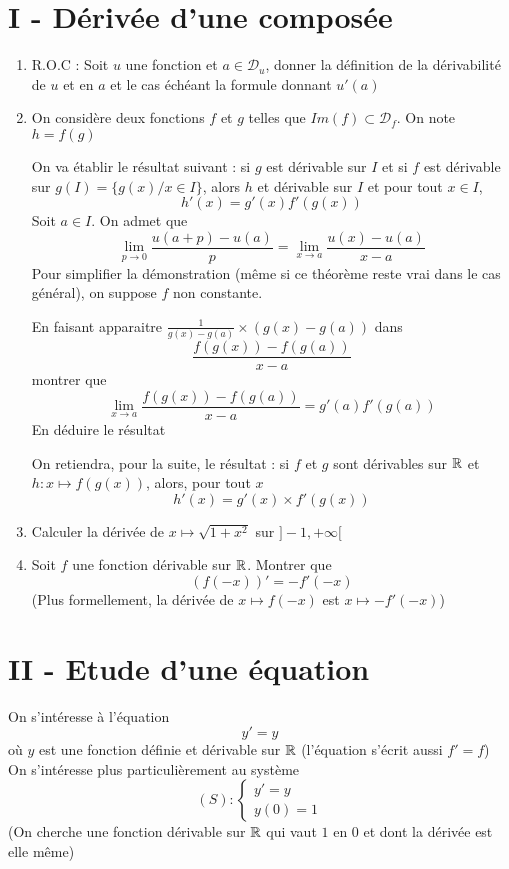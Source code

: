 \section*{I - Dérivée d'une composée}
\begin{enumerate}
\item R.O.C : Soit $u$ une fonction et $a\in \mathscr{D}_u$, donner la définition de la dérivabilité de $u$ et en $a$ et le cas échéant la formule donnant $u'(a)$
\item On considère deux fonctions $f$ et $g$ telles que $Im(f) \subset \mathscr{D}_f$. On note $h = f(g)$\newline

On va établir le résultat suivant : si $g$ est dérivable sur $I$ et si $f$ est dérivable sur $g(I) = \{g(x) / x\in I\}$, alors $h$ et dérivable sur $I$ et pour tout $x\in I$, $$h'(x) = g'(x)f'(g(x))$$
Soit $a \in I$. On admet que $$\underset{p\rightarrow 0}{\lim}\frac{u(a+p) - u(a)}{p} = \underset{x\rightarrow a}{\lim}\frac{u(x) - u(a)}{x-a}$$Pour simplifier la démonstration (même si ce théorème reste vrai dans le cas général), on suppose $f$ non constante.\newline 

En faisant apparaitre $\frac{1}{g(x) - g(a)} \times (g(x) - g(a))$ dans $$\frac{f(g(x)) - f(g(a))}{x- a}$$ montrer que $$ \underset{x\rightarrow a}{\lim}\frac{f(g(x)) - f(g(a))}{x -a} = g'(a)f'(g(a))$$ En déduire le résultat\newline

On retiendra, pour la suite, le résultat : si $f$ et $g$ sont dérivables sur $\mathbb{R}$ et $h:x\mapsto f(g(x))$, alors, pour tout $x$
$$\boxed{h'(x) = g'(x)\times f'(g(x))}$$
\item Calculer la dérivée de $x\mapsto \sqrt{1+x^2}$ sur $]-1,+\infty[$
\item Soit $f$ une fonction dérivable sur $\mathbb{R}$. Montrer que $$\boxed{(f(-x))' = -f'(-x)}$$(Plus formellement, la dérivée de $x\mapsto f(-x)$ est $x\mapsto -f'(-x)$)
\end{enumerate}
\section*{II - Etude d'une équation}
On s'intéresse à l'équation $$y' = y$$ où $y$ est une fonction définie et dérivable sur $\mathbb{R}$ (l'équation s'écrit aussi $f' = f$)
On s'intéresse plus particulièrement au système 
$$(S) : \left\{ \begin{array}{l}y'=y \\ y(0)=1 \end{array}\right.$$
(On cherche une fonction dérivable sur $\mathbb{R}$ qui vaut $1$ en $0$ et dont la dérivée est elle même)\newline


